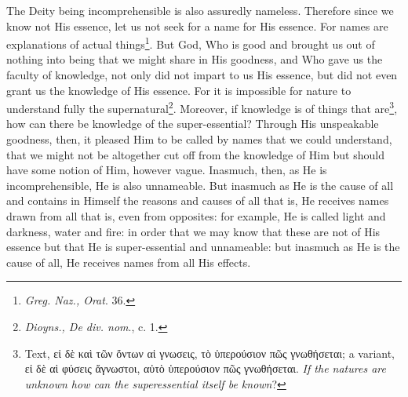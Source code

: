 The Deity being incomprehensible is also assuredly nameless. Therefore since we know not His essence, let us not seek for a name for His essence. For names are explanations of actual things\footnote{\emph{Greg. Naz., Orat}. 36.}. But God, Who is good and brought us out of nothing into being that we might share in His goodness, and Who gave us the faculty of knowledge, not only did not impart to us His essence, but did not even grant us the knowledge of His essence. For it is impossible for nature to understand fully the supernatural\footnote{\emph{Dioyns., De div. nom}., c. 1.}. Moreover, if knowledge is of things that are\footnote{Text, \textgreek{εἰ δὲ καὶ τῶν ὄντων αἱ γνωσεις, τὸ ὑπερούσιον πῶς γνωθήσεται}; a variant, \textgreek{εἰ δὲ αἱ φύσεις ἄγνωστοι, αὐτὸ ὑπερούσιον πῶς γνωθήσεται}. \emph{If the natures are unknown how can the superessential itself be known}?}, how can there be knowledge of the super-essential? Through His unspeakable goodness, then, it pleased Him to be called by names that we could understand, that we might not be altogether cut off from the knowledge of Him but should have some notion of Him, however vague. Inasmuch, then, as He is incomprehensible, He is also unnameable. But inasmuch as He is the cause of all and contains in Himself the reasons and causes of all that is, He receives names drawn from all that is, even from opposites: for example, He is called light and darkness, water and fire: in order that we may know that these are not of His essence but that He is super-essential and unnameable: but inasmuch as He is the cause of all, He receives names from all His effects.

